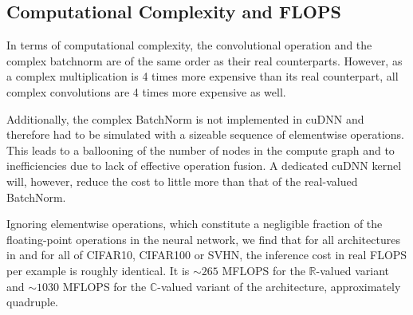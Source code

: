 \documentclass{article}
\begin{document}
\subsection{Computational Complexity and FLOPS}\label{CCFLOPS}
In terms of computational complexity, the convolutional operation and the complex batchnorm are of the same order as their real counterparts. However, as a complex multiplication is 4 times more expensive than its real counterpart, all complex convolutions are 4 times more expensive as well.

Additionally, the complex BatchNorm is not implemented in cuDNN and therefore had to be simulated with a sizeable sequence of elementwise operations. This leads to a ballooning of the number of nodes in the compute graph and to inefficiencies due to lack of effective operation fusion. A dedicated cuDNN kernel will, however, reduce the cost to little more than that of the real-valued BatchNorm.

Ignoring elementwise operations, which constitute a negligible fraction of the floating-point operations in the neural network, we find that for all architectures in \label{results_activation} and for all of CIFAR10, CIFAR100 or SVHN, the inference cost in real FLOPS per example is roughly identical. It is $\sim 265$ MFLOPS for the $\mathbb{R}$-valued variant and $\sim 1030$ MFLOPS for the $\mathbb{C}$-valued variant of the architecture, approximately quadruple.
\end{document}
